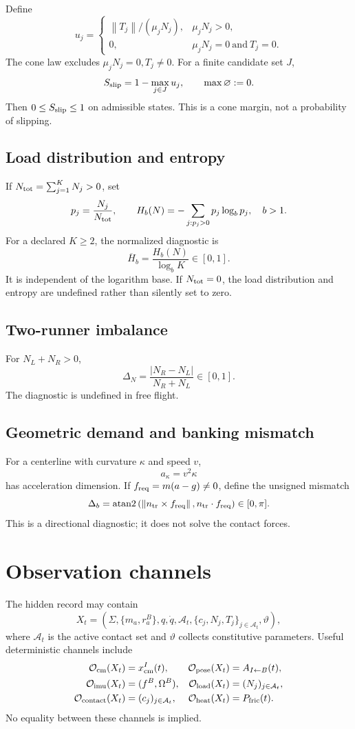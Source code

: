 \documentclass[11pt,a4paper]{article}
\theoremstyle{definition}
\theoremstyle{plain}
\theoremstyle{remark}
\newcommand{\norm}[1]{\left\lVert #1\right\rVert}
\newcommand{\Ocal}{\mathcal O}
\newcommand{\Acal}{\mathcal A}
\begin{document}
Define
\[
u_j=
\begin{cases}
\norm{T_j}/(\mu_jN_j),&\mu_jN_j>0,\\
0,&\mu_jN_j=0\ \text{and}\ T_j=0 .
\end{cases}
\]
The cone law excludes \(\mu_jN_j=0,T_j\ne0\). For a finite candidate
set \(J\),
\[
S_{\rm slip}=1-\max_{j\in J}u_j,\qquad
\max\varnothing:=0.
\]
Then \(0\le S_{\rm slip}\le1\) on admissible states. This is a cone
margin, not a probability of slipping.

\subsection{Load distribution and entropy}

If \(N_{\rm tot}=\sum_{j=1}^KN_j>0\), set
\[
p_j=\frac{N_j}{N_{\rm tot}},\qquad
H_b(N)=-\sum_{j:p_j>0}p_j\log_b p_j,
\quad b>1.
\]
For a declared \(K\ge2\), the normalized diagnostic is
\[
\overline H_b=\frac{H_b(N)}{\log_bK}\in[0,1].
\]
It is independent of the logarithm base. If \(N_{\rm tot}=0\), the
load distribution and entropy are undefined rather than silently set
to zero.

\subsection{Two-runner imbalance}

For \(N_L+N_R>0\),
\[
\Delta_N
=\frac{\lvert N_R-N_L\rvert}{N_R+N_L}\in[0,1].
\]
The diagnostic is undefined in free flight.

\subsection{Geometric demand and banking mismatch}

For a centerline with curvature \(\kappa\) and speed \(v\),
\[
a_\kappa=v^2\kappa
\]
has acceleration dimension. If \(f_{\rm req}=m(a-g)\ne0\), define the
unsigned mismatch
\[
\Delta_b
=\operatorname{atan2}
\left(
\norm{n_{\rm tr}\times f_{\rm req}},
n_{\rm tr}\cdot f_{\rm req}
\right)\in[0,\pi].
\]
This is a directional diagnostic; it does not solve the contact
forces.

\section{Observation channels}

The hidden record may contain
\[
X_t=(\Sigma,\{m_a,r_a^B\},q,\dot q,\Acal_t,
\{c_j,N_j,T_j\}_{j\in\Acal_t},\vartheta),
\]
where \(\Acal_t\) is the active contact set and \(\vartheta\) collects
constitutive parameters. Useful deterministic channels include
\begin{align*}
\Ocal_{\rm cm}(X_t)&=x_{\rm cm}^I(t),&
\Ocal_{\rm pose}(X_t)&=A_{I\leftarrow B}(t),\\
\Ocal_{\rm imu}(X_t)&=(f^B,\Omega^B),&
\Ocal_{\rm load}(X_t)&=(N_j)_{j\in\Acal_t},\\
\Ocal_{\rm contact}(X_t)&=(c_j)_{j\in\Acal_t},&
\Ocal_{\rm heat}(X_t)&=P_{\rm fric}(t).
\end{align*}
No equality between these channels is implied.
\end{document}
